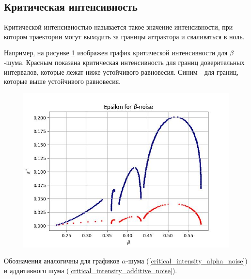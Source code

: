 \subsection{Критическая интенсивность}

    Критической интенсивностью называется такое значение интенсивности, при котором траектории могут выходить за границы аттрактора и сваливаться в ноль.

    Например, на рисунке \ref{critical_intensity_beta_noise} изображен график критической интенсивности для \(\beta\)-шума. Красным показана критическая интенсивность для границ доверительных интервалов, которые лежат ниже устойчивого равновесия. Синим - для границ, которые выше устойчивого равновесия. 



    \begin{figure}
        \centering
        \includegraphics[width=\textwidth]{stochastic/images/critical_intensity_beta_noise.jpg}
        
        \captionsetup{justification=centering}
        \caption{}
        \label{critical_intensity_beta_noise}
    \end{figure}
        
    Обозначения аналогичны для графиков \(\alpha\)-шума (\ref{critical_intensity_alpha_noise}) и аддитивного шума (\ref{critical_intensity_additive_noise}).

